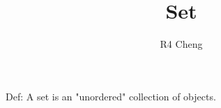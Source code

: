 \documentclass[12pt,a4paper]{article}
\title{Set}
\author{R4 Cheng}
\date{}
\begin{document}
\maketitle

Def: A set is an "unordered" collection of objects.
\end{document}

